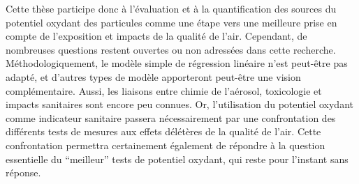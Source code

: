 Cette thèse participe donc à l'évaluation et à la quantification des sources
du potentiel oxydant des particules comme une étape vers une meilleure prise en compte de
l'exposition et impacts de la qualité de l'air. Cependant, de nombreuses questions restent
ouvertes ou non adressées dans cette recherche. Méthodologiquement, le modèle simple de
régression linéaire n'est peut-être pas adapté, et d'autres types de modèle apporteront
peut-être une vision complémentaire. Aussi, les liaisons entre chimie de l'aérosol,
toxicologie et impacts sanitaires sont encore peu connues. Or, l'utilisation du potentiel
oxydant comme indicateur sanitaire passera nécessairement par une confrontation des
différents tests de mesures aux effets délétères de la qualité de l'air. Cette
confrontation permettra certainement également de répondre à la question essentielle du
``meilleur'' tests de potentiel oxydant, qui reste pour l'instant sans réponse.
